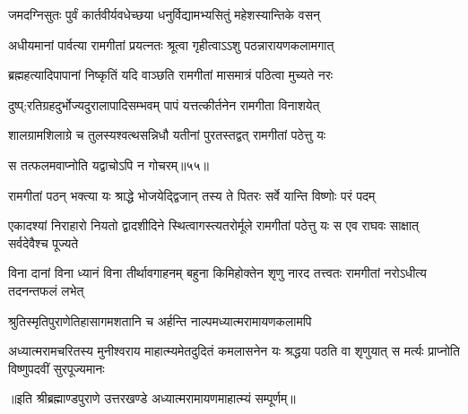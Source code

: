 \twolineshloka
{जमदग्निसुतः पुर्वं कार्तवीर्यवधेच्छया}
{धनुर्विद्यामभ्यसितुं महेशस्यान्तिके वसन्} %

\twolineshloka
{अधीयमानां पार्वत्या रामगीतां प्रयत्नतः}
{श्रूत्वा गृहीत्वाऽऽशु पठन्नारायणकलामगात्} %

\twolineshloka
{ब्रह्महत्यादिपापानां निष्कृतिं यदि वाञ्छति}
{रामगीतां मासमात्रं पठित्वा मुच्यते नरः} %

\twolineshloka
{दुष्प्;रतिग्रहदुर्भोज्यदुरालापादिसम्भवम्}
{पापं यत्तत्कीर्तनेन रामगीता विनाशयेत्} %

\twolineshloka
{शालग्रामशिलाग्रे च तुलस्यश्वत्थसन्निधौ}
{यतीनां पुरतस्तद्वत् रामगीतां पठेत्तु यः} %

{स तत्फलमवाप्नोति यद्वाचोऽपि न गोचरम्॥५५॥} %


\twolineshloka
{रामगीतां पठन् भक्त्या यः श्राद्धे भोजयेद्द्विजान्}
{तस्य ते पितरः सर्वे यान्ति विष्णोः परं पदम्} %

\threelineshloka
{एकादश्यां निराहारो नियतो द्वादशीदिने}
{स्थित्वागस्त्यतरोर्मूले रामगीतां पठेत्तु यः}
{स एव राघवः साक्षात् सर्वदेवैश्च पूज्यते} %

\threelineshloka
{विना दानां विना ध्यानं विना तीर्थावगाहनम्}
{बहुना किमिहोक्तेन शृणु नारद तत्त्वतः}
{रामगीतां नरोऽधीत्य तदनन्तफलं लभेत्} %

\twolineshloka
{श्रुतिस्मृतिपुराणेतिहासागमशतानि च}
{अर्हन्ति नाल्पमध्यात्मरामायणकलामपि} %

\fourlineindentedshloka
{अध्यात्मरामचरितस्य मुनीश्वराय}
{माहात्म्यमेतदुदितं कमलासनेन}
{यः श्रद्धया पठति वा शृणुयात् स मर्त्यः}
{प्राप्नोति विष्णुपदवीं सुरपूज्यमानः} %

{॥इति श्रीब्रह्माण्डपुराणे उत्तरखण्डे अध्यात्मरामायणमाहात्म्यं सम्पूर्णम्॥
}

